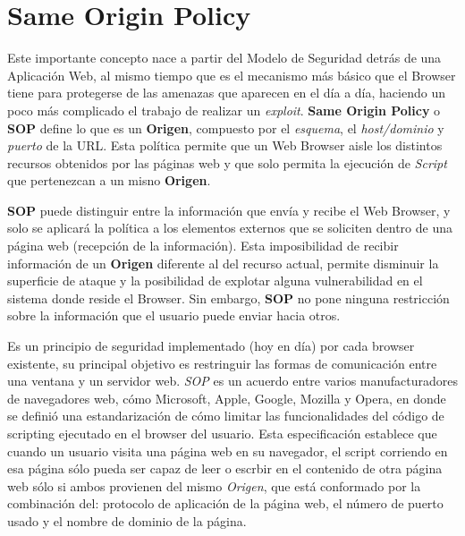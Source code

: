 \section{Same Origin Policy}
\label{chap:SOP}

Este importante concepto nace a partir del Modelo de Seguridad detrás de una Aplicación Web, al mismo tiempo que es el mecanismo más básico que el Browser tiene para protegerse de las amenazas que aparecen en el día a día, haciendo un poco más complicado el trabajo de realizar un \textit{exploit}. \textbf{Same Origin Policy} o \textbf{SOP} define lo que es un \textbf{Origen}, compuesto por el \textit{esquema}, el \textit{host/dominio} y \textit{puerto} de la URL. Esta política permite que un Web Browser aisle los distintos recursos obtenidos por las páginas web y que solo permita la ejecución de \textit{Script} que pertenezcan a un misno \textbf{Origen}. 

\textbf{SOP} puede distinguir entre la información que envía y recibe el Web Browser, y solo se aplicará la política a los elementos externos que se soliciten dentro de una página web (recepción de la información). Esta imposibilidad de recibir información de un \textbf{Origen} diferente al del recurso actual, permite disminuir la superficie de ataque y la posibilidad de explotar alguna vulnerabilidad en el sistema donde reside el Browser. Sin embargo, \textbf{SOP} no pone ninguna restricción sobre la información que el usuario puede enviar hacia otros. 


Es un principio de seguridad implementado (hoy en día) por cada browser existente, su principal objetivo es restringuir las formas de comunicación entre una ventana y un servidor web. \textit{SOP} es un acuerdo entre varios manufacturadores de navegadores web, cómo Microsoft, Apple, Google, Mozilla y Opera, en donde se definió una estandarización de cómo limitar las funcionalidades del código de scripting ejecutado en el browser del usuario. Esta especificación establece que  cuando un usuario visita una página web en su navegador, el script corriendo en esa página sólo pueda ser capaz de leer o escrbir en el contenido de otra página web sólo si ambos provienen del mismo \textit{Origen}, que está conformado por la combinación del: protocolo de aplicación de la página web, el número de puerto usado y el nombre de dominio de la página.
    
    
